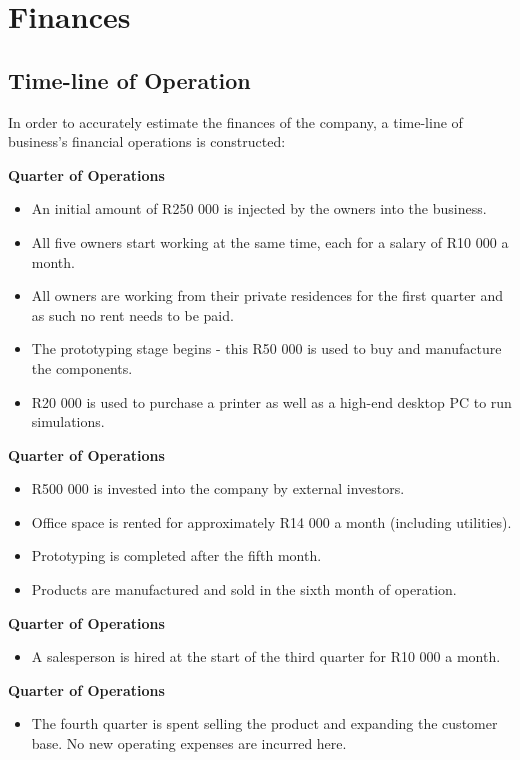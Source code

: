 \newpage

\chapter{Finances}

\section{Time-line of Operation}
In order to accurately estimate the finances of the company, a time-line of business's financial operations is constructed:

{\bfseries {} Quarter of Operations}
\begin{itemize}
\item An initial amount of R250 000 is injected by the owners into the business.
\item All five owners start working at the same time, each for a salary of R10 000 a month.
\item All owners are working from their private residences for the first quarter and as such no rent needs to be paid.
\item The prototyping stage begins - this R50 000 is used to buy and manufacture the components.
\item R20 000 is used to purchase a printer as well as a high-end desktop PC to run simulations.
\end{itemize}

{\bfseries {} Quarter of Operations}
\begin{itemize}
\item R500 000 is invested into the company by external investors.
\item Office space is rented for approximately R14 000 a month (including utilities).
\item Prototyping is completed after the fifth month.
\item Products are manufactured and sold in the sixth month of operation.
\end{itemize}

{\bfseries {} Quarter of Operations}
\begin{itemize}
\item A salesperson is hired at the start of the third quarter for R10 000 a month.
\end{itemize}

{\bfseries {} Quarter of Operations}
\begin{itemize}
\item The fourth quarter is spent selling the product and expanding the customer base. No new operating expenses are incurred here.
\end{itemize}

